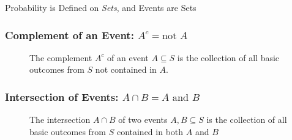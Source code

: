 \documentclass[handout]{beamer}
\begin{document}
\begin{frame}
\begin{center}
	\Huge Probability is Defined on \emph{Sets}, and Events are Sets
\end{center}
\end{frame}
\def\eventA{(-0.35,0) circle (1.2)}
\def\eventB{(1.35,0) circle (1.2)}
\def\samplespace{(-2,-2) rectangle (3,2)}
\begin{frame}
\frametitle{Complement of an Event: $A^c = \mbox{not } A$}

\begin{figure}
\centering
{}
\caption{The complement $A^c$ of an event $A\subseteq S$ is the collection of all basic outcomes from $S$ not contained in $A$.}
\end{figure}
\end{frame}
\begin{frame}
\frametitle{Intersection of Events: $A\cap B = A \mbox{ and } B$}
\begin{figure}
\centering
{}
\caption{The intersection $A\cap B$ of two events $A,B\subseteq S$ is the collection of all basic outcomes from $S$ contained in both $A$ and $B$}
\end{figure}
\end{frame}
\end{document}
